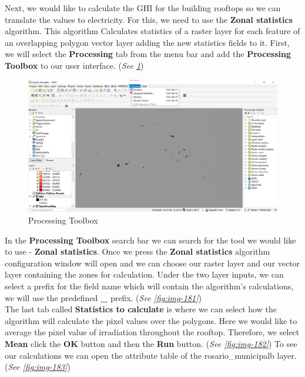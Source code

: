 \documentclass[
]{book}
\begin{document}
Next, we would like to calculate the GHI for the building rooftops so we can translate the values to electricity. For this, we need to use the \textbf{Zonal statistics} algorithm. This algorithm Calculates statistics of a raster layer for each feature of an overlapping polygon vector layer adding the new statistics fields to it.
First, we will select the \textbf{Processing} tab from the menu bar and add the \textbf{Processing Toolbox} to our user interface. (\emph{See \ref{fig:img-18}})

\begin{figure}

{\centering \includegraphics[width=1\linewidth]{images/processing} 

}

\caption{Processing Toolbox}\label{fig:img-18}
\end{figure}

In the \textbf{Processing Toolbox} search bar we can search for the tool we would like to use - \textbf{Zonal statistics}. Once we press the \textbf{Zonal statistics} algorithm configuration window will open and we can choose our raster layer and our vector layer containing the zones for calculation. Under the two layer inputs, we can select a prefix for the field name which will contain the algorithm's calculations, we will use the predefined \textbf{\_} prefix. (\emph{See \ref{fig:img-181}})\\
The last tab called \textbf{Statistics to calculate} is where we can select how the algorithm will calculate the pixel values over the polygons. Here we would like to average the pixel value of irradiation throughout the rooftop. Therefore, we select \textbf{Mean} click the \textbf{OK} button and then the \textbf{Run} button. (\emph{See \ref{fig:img-182}})
To see our calculations we can open the attribute table of the {rosario\_municipalb} layer. (\emph{See \ref{fig:img-183}})
\end{document}

